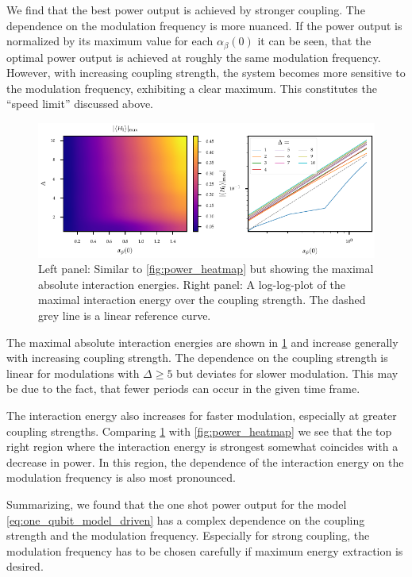We find that the best power output is achieved by stronger
coupling. The dependence on the modulation frequency is more
nuanced. If the power output is normalized by its maximum value for
each \(α_{β}(0)\) it can be seen, that the optimal power output is
achieved at roughly the same modulation frequency. However, with
increasing coupling strength, the system becomes more sensitive to the
modulation frequency, exhibiting a clear maximum. This constitutes the
``speed limit'' discussed above.

\begin{figure}[htb]
  \centering
  \includegraphics{figs/one_bath_mod/interaction_nontuned}
  \caption{\label{fig:interaction_nontuned} Left panel: Similar to
    \cref{fig:power_heatmap} but showing the maximal absolute
    interaction energies. Right panel: A log-log-plot of the maximal
    interaction energy over the coupling strength. The dashed grey
    line is a linear reference curve.}
\end{figure}

The maximal absolute interaction energies are shown in
\cref{fig:interaction_nontuned} and increase generally with increasing
coupling strength. The dependence on the coupling strength is linear
for modulations with \(Δ\geq 5\) but deviates for slower
modulation. This may be due to the fact, that fewer periods can occur
in the given time frame.

The interaction energy also increases for faster modulation,
especially at greater coupling strengths. Comparing
\cref{fig:interaction_nontuned} with \cref{fig:power_heatmap} we see
that the top right region where the interaction energy is strongest
somewhat coincides with a decrease in power. In this region, the
dependence of the interaction energy on the modulation frequency is
also most pronounced.

Summarizing, we found that the one shot power output for the model
\cref{eq:one_qubit_model_driven} has a complex dependence on the
coupling strength and the modulation frequency. Especially for strong
coupling, the modulation frequency has to be chosen carefully if
maximum energy extraction is desired.

